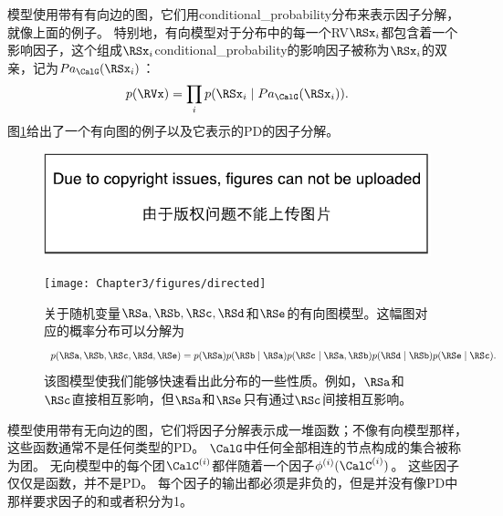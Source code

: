 模型使用带有有向边的图，它们用\gls{conditional_probability}分布来表示因子分解，就像上面的例子。
特别地，有向模型对于分布中的每一个\gls{RV}$\RSx_i$都包含着一个影响因子，这个组成$\RSx_i$\gls{conditional_probability}的影响因子被称为$\RSx_i$的双亲，记为$Pa_\CalG(\RSx_i)$：
\begin{equation}
p(\RVx) = \prod_i p(\RSx_i \mid Pa_\CalG(\RSx_i)).
\end{equation}
图\ref{fig:chap3_directed}给出了一个有向图的例子以及它表示的\gls{PD}的因子分解。
\begin{figure}[!htb]
\ifOpenSource
\centerline{\includegraphics{figure.pdf}}
\else
\centerline{\texttt{[image: Chapter3/figures/directed]}}
\fi
\captionsetup{singlelinecheck=off}
\caption[.]{关于随机变量$\RSa, \RSb, \RSc, \RSd$和$\RSe$的有向图模型。这幅图对应的概率分布可以分解为
\begin{equation}
p(\RSa, \RSb, \RSc, \RSd, \RSe) = p(\RSa) p(\RSb \mid \RSa) p(\RSc \mid \RSa, \RSb) p(\RSd \mid \RSb) p(\RSe \mid \RSc).
\end{equation}
该图模型使我们能够快速看出此分布的一些性质。例如，$\RSa$和$\RSc$直接相互影响，但$\RSa$和$\RSe$只有通过$\RSc$间接相互影响。
}
\label{fig:chap3_directed}
\end{figure}



模型使用带有无向边的图，它们将因子分解表示成一堆函数；不像有向模型那样，这些函数通常不是任何类型的\gls{PD}。
$\CalG$中任何全部相连的节点构成的集合被称为团。
无向模型中的每个团$\CalC^{(i)}$都伴随着一个因子$\phi^{(i)}(\CalC^{(i)})$。
 这些因子仅仅是函数，并不是\gls{PD}。
 每个因子的输出都必须是非负的，但是并没有像\gls{PD}中那样要求因子的和或者积分为1。

